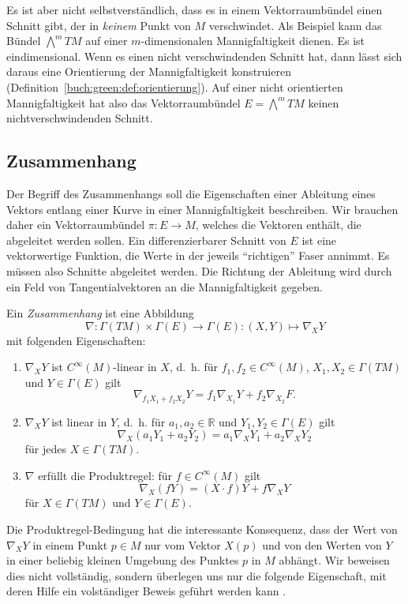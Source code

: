 Es ist aber nicht selbstverständlich, dass es in einem Vektorraumbündel
einen Schnitt gibt, der in \emph{keinem} Punkt von $M$ verschwindet.
Als Beispiel kann das Bündel $\bigwedge^mTM$ auf einer $m$-dimensionalen
Mannigfaltigkeit dienen.
Es ist eindimensional.
Wenn es einen nicht verschwindenden Schnitt hat, dann lässt sich daraus
eine Orientierung der Mannigfaltigkeit konstruieren
(Definition~\ref{buch:green:def:orientierung}).
Auf einer nicht orientierten Mannigfaltigkeit hat also das Vektorraumbündel
$E=\bigwedge^m TM$ keinen nichtverschwindenden Schnitt.


%
%
\subsection{Zusammenhang}
Der Begriff des Zusammenhangs soll die Eigenschaften einer Ableitung 
eines Vektors entlang einer Kurve in einer Mannigfaltigkeit beschreiben.
Wir brauchen daher ein Vektorraumbündel $\pi\colon E\to M$, welches
die Vektoren enthält, die abgeleitet werden sollen.
Ein differenzierbarer Schnitt von $E$ ist eine vektorwertige
Funktion, die Werte in der jeweils ``richtigen'' Faser annimmt.
Es müssen also Schnitte abgeleitet werden.
Die Richtung der Ableitung wird durch ein Feld von Tangentialvektoren
an die Mannigfaltigkeit gegeben.

\begin{definition}
Ein \emph{Zusammenhang} ist eine Abbildung
%
\[
\nabla 
\colon
\Gamma(TM)\times \Gamma(E) \to \Gamma(E)
:
(X,Y) \mapsto \nabla_X Y
\]
mit folgenden Eigenschaften:
\begin{enumerate}
\item $\nabla_X Y$ ist $C^\infty(M)$-linear in $X$, d.~h. für 
$f_1,f_2\in C^{\infty}(M)$, $X_1,X_2\in \Gamma(TM)$ und $Y\in\Gamma(E)$ gilt
\[
\nabla_{f_1X_1+f_2X_2}Y
=
f_1\nabla_{X_1}Y + f_2\nabla_{X_2}F.
\]
\item $\nabla_X Y$ ist linear in $Y$, d.~h. für $a_1,a_2\in\mathbb{R}$
und $Y_1,Y_2\in \Gamma(E)$ gilt
\[
\nabla_X(a_1Y_1+a_2Y_2)
=
a_1\nabla_XY_1
+
a_2\nabla_XY_2
\]
für jedes $X\in\Gamma(TM)$.
\item
$\nabla$ erfüllt die Produktregel: für $f\in C^\infty(M)$ gilt
%
\[
\nabla_X (fY)
=
(X\cdot f)Y + f\nabla_X Y
\]
für $X\in\Gamma(TM)$ und $Y\in\Gamma(E)$.
\end{enumerate}
\end{definition}

Die Produktregel-Bedingung hat die interessante Konsequenz, dass der
Wert von $\nabla_XY$ in einem Punkt $p\in M$ nur vom Vektor $X(p)$ und
von den Werten von $Y$ in einer beliebig kleinen Umgebung des Punktes
$p$ in $M$ abhängt.
Wir beweisen dies nicht vollständig, sondern überlegen uns nur die
folgende Eigenschaft, mit deren Hilfe ein volständiger Beweis geführt
werden kann \cite[Proposition 4.5]{buch:leerm}.


